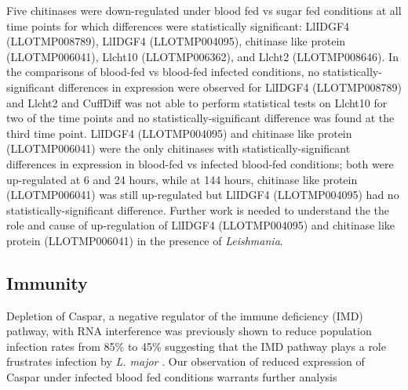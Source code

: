 Five chitinases were down-regulated under blood fed vs sugar fed conditions at all time points for which differences were statistically significant: LlIDGF4 (LLOTMP008789), LlIDGF4 (LLOTMP004095), chitinase like protein (LLOTMP006041), Llcht10 (LLOTMP006362), and Llcht2 (LLOTMP008646).  In the comparisons of blood-fed vs blood-fed infected conditions, no statistically-significant differences in expression were observed for LlIDGF4 (LLOTMP008789) and Llcht2 and CuffDiff was not able to perform statistical tests on Llcht10 for two of the time points and no statistically-significant difference was found at the third time point. LlIDGF4 (LLOTMP004095) and chitinase like protein (LLOTMP006041) were the only chitinases with statistically-significant differences in expression in blood-fed vs infected blood-fed conditions; both were up-regulated at 6 and 24 hours, while at 144 hours, chitinase like protein (LLOTMP006041) was still up-regulated but LlIDGF4 (LLOTMP004095) had no statistically-significant difference. Further work is needed to understand the the role and cause of up-regulation of LlIDGF4 (LLOTMP004095) and chitinase like protein (LLOTMP006041) in the presence of \emph{Leishmania}.

\subsection{Immunity}

Depletion of Caspar, a negative regulator of the immune deficiency (IMD) pathway, with RNA interference was previously shown to reduce population infection rates from 85\% to 45\% suggesting that the IMD pathway plays a role frustrates infection by \emph{L. major} \cite{Telleria2012}.  Our observation of reduced expression of Caspar under infected blood fed conditions warrants further analysis

